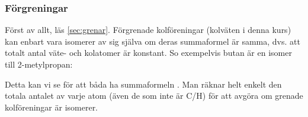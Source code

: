 \subsubsection{Förgreningar}
Först av allt, läs \cref{sec:grenar}. Förgrenade kolföreningar (kolväten i denna kurs) kan enbart vara isomerer av sig själva om deras summaformel är samma, dvs. att totalt antal väte- och kolatomer är konstant. So exempelvis butan är en isomer till 2-metylpropan:
\begin{center}
\end{center}
Detta kan vi se för att båda ha summaformeln . Man räknar helt enkelt den totala antalet av varje atom (även de som inte är C/H) för att avgöra om grenade kolföreningar är isomerer.

